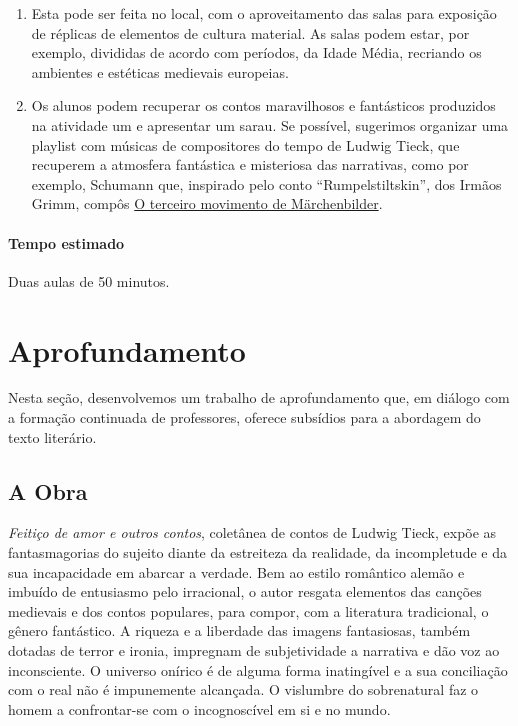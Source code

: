 \documentclass[12pt]{extarticle}
\begin{document}
\begin{enumerate}



\item
Esta pode ser feita no local, com o aproveitamento das salas para exposição 
de réplicas de elementos de cultura material. As salas podem estar, por exemplo, 
divididas de acordo com períodos, da Idade Média, recriando os ambientes e estéticas 
medievais europeias.

\item
Os alunos podem recuperar os contos maravilhosos e fantásticos produzidos na atividade um e 
apresentar um sarau. 
Se possível, sugerimos organizar uma playlist com músicas de compositores do tempo de Ludwig Tieck, que
recuperem a atmosfera fantástica e misteriosa das narrativas, como por exemplo, Schumann que, inspirado 
pelo conto ``Rumpelstiltskin'', dos Irmãos Grimm, compôs \href{https://www.youtube.com/watch?v=zaX0IjTMChI&ab_channel=PacoM}{O terceiro movimento de Märchenbilder}.

\end{enumerate}

\paragraph{Tempo estimado} Duas aulas de 50 minutos. 


\section{Aprofundamento}

Nesta seção, desenvolvemos um trabalho de aprofundamento que, em diálogo
com a formação continuada de professores, oferece subsídios para a
abordagem do texto literário.

\subsection{A Obra}

\emph{Feitiço de amor e outros contos}, coletânea de contos de Ludwig Tieck,
expõe as fantasmagorias do sujeito diante da estreiteza da realidade, da
incompletude e da sua incapacidade em abarcar a verdade. Bem ao estilo
romântico alemão e imbuído de entusiasmo pelo irracional, o autor
resgata elementos das canções medievais e dos contos populares, para
compor, com a literatura tradicional, o gênero fantástico. A riqueza e a
liberdade das imagens fantasiosas, também dotadas de terror e ironia,
impregnam de subjetividade a narrativa e dão voz ao inconsciente. O
universo onírico é de alguma forma inatingível e a sua conciliação com o
real não é impunemente alcançada. O vislumbre do sobrenatural faz o
homem a confrontar-se com o incognoscível em si e no mundo.
\end{document}
